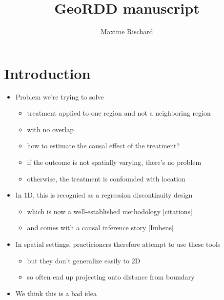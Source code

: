 \documentclass[letter]{article}
\title{GeoRDD manuscript}
\author{Maxime Rischard}
\providecommand{\tightlist}{%
      \setlength{\itemsep}{0pt}\setlength{\parskip}{0pt}}
\providecommand{\tightlist}{%
  	  \setlength{\itemsep}{0pt}\setlength{\parskip}{0pt}}
\begin{document}
    
    
    
    \maketitle
    
    
	\tableofcontents


    





    	\section{Introduction}\label{introduction}

\begin{itemize}
\tightlist
\item
  Problem we're trying to solve

  \begin{itemize}
  \tightlist
  \item
    treatment applied to one region and not a neighboring region
  \item
    with no overlap
  \item
    how to estimate the causal effect of the treatment?
  \item
    if the outcome is not spatially varying, there's no problem
  \item
    otherwise, the treatment is confounded with location
  \end{itemize}
\item
  In 1D, this is recognied as a regression discontinuity design

  \begin{itemize}
  \tightlist
  \item
    which is now a well-established methodology {[}citations{]}
  \item
    and comes with a causal inference story {[}Imbens{]}
  \end{itemize}
\item
  In spatial settings, practicioners therefore attempt to use these
  tools

  \begin{itemize}
  \tightlist
  \item
    but they don't generalize easily to 2D
  \item
    so often end up projecting onto distance from boundary
  \end{itemize}
\item
  We think this is a bad idea


\end{itemize}
\end{document}
